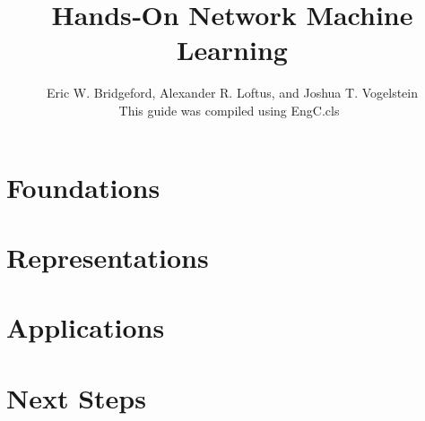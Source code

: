 \documentclass{EngC}
\newcommand\cambridge{EngC}
\theoremstyle{plain}%
\theoremstyle{definition}
\theoremstyle{remark}
\begin{document}
\title[]
{Hands‐On Network Machine Learning}

\author{Eric W. Bridgeford, Alexander R. Loftus, and Joshua T. Vogelstein\\[3\baselineskip]
This guide was compiled using \hbox{\cambridge.cls \version}\\[\baselineskip]}

\frontmatter
\maketitle
\tableofcontents
\listoffigures
\listoftables
\listoffloatingboxes
\listofcontributors





\mainmatter
\part{Foundations}
\label{p:found}



\part{Representations}
\label{p:rep}




\part{Applications}
\label{p:app}




\part{Next Steps}
\label{p:next}


\backmatter
\appendix







\endappendix

\theendnotes


\label{refs}

\cleardoublepage




\end{document}
